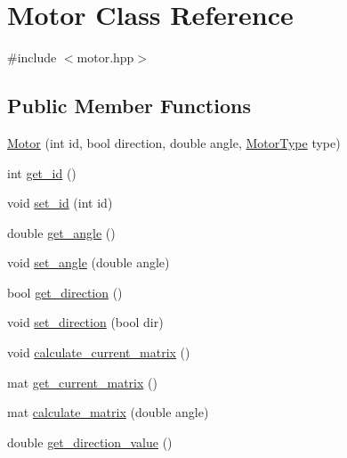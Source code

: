 \hypertarget{class_motor}{\section{Motor Class Reference}
\label{class_motor}
}


{\ttfamily \#include $<$motor.\-hpp$>$}

\subsection*{Public Member Functions}
\begin{DoxyCompactItemize}
\item 
\hyperlink{class_motor_abe780b3e871a85b968d6fee888205b51}{Motor} (int id, bool direction, double angle, \hyperlink{motor_8hpp_a3f29f8952bca737db7bc832cd0a6d6f3}{Motor\-Type} type)
\item 
int \hyperlink{class_motor_a88de4d6f7d85d70f75d5510cb2497d0f}{get\-\_\-id} ()
\item 
void \hyperlink{class_motor_a0fc563074b6536653e531f5d9866cef4}{set\-\_\-id} (int id)
\item 
double \hyperlink{class_motor_af5664216f4ee9367282cb1e1986b3a13}{get\-\_\-angle} ()
\item 
void \hyperlink{class_motor_a83895c894993a9e6c165be085b570138}{set\-\_\-angle} (double angle)
\item 
bool \hyperlink{class_motor_afccab98ca0cef41c88889d1a230bef10}{get\-\_\-direction} ()
\item 
void \hyperlink{class_motor_a04549cf142dfe4688266f92f549d74d7}{set\-\_\-direction} (bool dir)
\item 
void \hyperlink{class_motor_a1195af10210c3335233d7ee65a2e178e}{calculate\-\_\-current\-\_\-matrix} ()
\item 
mat \hyperlink{class_motor_a54cb596f4a6f050e84f6534abeb57c0c}{get\-\_\-current\-\_\-matrix} ()
\item 
mat \hyperlink{class_motor_ad3e3edb6ebd548fbd3e4b4720af2d311}{calculate\-\_\-matrix} (double angle)
\item 
double \hyperlink{class_motor_a32e5af9c7721419fd9df29d70c2bd6b4}{get\-\_\-direction\-\_\-value} ()
\end{DoxyCompactItemize}


